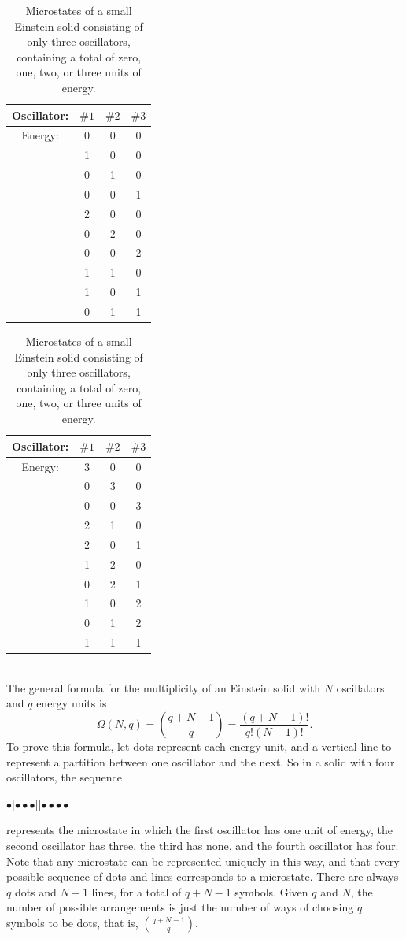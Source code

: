 \documentclass[11pt]{exam}
\begin{document}
\begin{table}[htp]
\centering
\begin{tabular}{cccc} 
Oscillator: & $\#1$ & $\#2$ & $\#3$\\ 
\hline
Energy: & 0 & 0 & 0\\
        & 1 & 0 & 0\\
        & 0 & 1 & 0\\
        & 0 & 0 & 1\\
        & 2 & 0 & 0\\
        & 0 & 2 & 0\\
        & 0 & 0 & 2\\
        & 1 & 1 & 0\\
        & 1 & 0 & 1\\
        & 0 & 1 & 1
\end{tabular}
\quad
\begin{tabular}{cccc} 
Oscillator: & $\#1$ & $\#2$ & $\#3$\\ 
\hline 
Energy: & 3 & 0 & 0\\
        & 0 & 3 & 0\\
        & 0 & 0 & 3\\
        & 2 & 1 & 0\\
        & 2 & 0 & 1\\
        & 1 & 2 & 0\\
        & 0 & 2 & 1\\
        & 1 & 0 & 2\\
        & 0 & 1 & 2\\
        & 1 & 1 & 1
\end{tabular}
\label{default}
\caption{Microstates of a small Einstein solid consisting of only three oscillators, containing a total of zero, one, two, or three units of energy.}
\end{table}\\
\hspace*{10mm}The general formula for the multiplicity of an Einstein solid with $N$ oscillators and $q$ energy units is 
\begin{equation}\tag{2.9}
\Omega(N,q)=\binom{q+N-1}{q}=\frac{(q+N-1)!}{q!(N-1)!}.  
\end{equation}
To prove this formula, let dots represent each energy unit, and a vertical line to represent a partition between one oscillator and the next. So in a solid with four oscillators, the sequence 
\begin{center}
$\bullet | \bullet\bullet\bullet ||\bullet\bullet\bullet\bullet$   
\end{center}
represents the microstate in which the first oscillator has one unit of energy, the second oscillator has three, the third has none, and the fourth oscillator has four. Note that any microstate can be represented uniquely in this way, and that every possible sequence of dots and lines corresponds to a microstate. There are always $q$ dots and $N-1$ lines, for a total of $q+N-1$ symbols. Given $q$ and $N$, the number of possible arrangements is just the number of ways of choosing $q$ symbols to be dots, that is, $\binom{q+N-1}{q}$. 
\newpage
\end{document}
